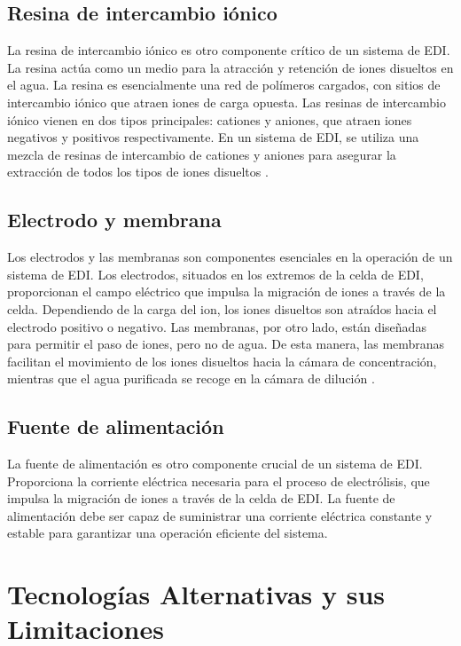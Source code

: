 \subsection{Resina de intercambio iónico}
La resina de intercambio iónico es otro componente crítico de un sistema de EDI. La resina actúa como un medio para la
atracción y retención de iones disueltos en el agua. La resina es esencialmente una red de polímeros cargados, con sitios
de intercambio iónico que atraen iones de carga opuesta. Las resinas de intercambio iónico vienen en dos tipos principales:
cationes y aniones, que atraen iones negativos y positivos respectivamente. En un sistema de EDI, se utiliza una mezcla de
resinas de intercambio de cationes y aniones para asegurar la extracción de todos los tipos de iones disueltos \cite{nogueraResinasIntercambioIonico}.

\subsection{Electrodo y membrana}
Los electrodos y las membranas son componentes esenciales en la operación de un sistema de EDI. Los electrodos, situados en
los extremos de la celda de EDI, proporcionan el campo eléctrico que impulsa la migración de iones a través de la celda.
Dependiendo de la carga del ion, los iones disueltos son atraídos hacia el electrodo positivo o negativo. Las membranas,
por otro lado, están diseñadas para permitir el paso de iones, pero no de agua. De esta manera, las membranas facilitan el
movimiento de los iones disueltos hacia la cámara de concentración, mientras que el agua purificada se recoge en la cámara
de dilución \cite{lenntechElectrodeionizationEDI}.

\subsection{Fuente de alimentación}
La fuente de alimentación es otro componente crucial de un sistema de EDI. Proporciona la corriente eléctrica necesaria
para el proceso de electrólisis, que impulsa la migración de iones a través de la celda de EDI. La fuente de alimentación
debe ser capaz de suministrar una corriente eléctrica constante y estable para garantizar una operación eficiente del sistema.



\section{Tecnologías Alternativas y sus Limitaciones}

